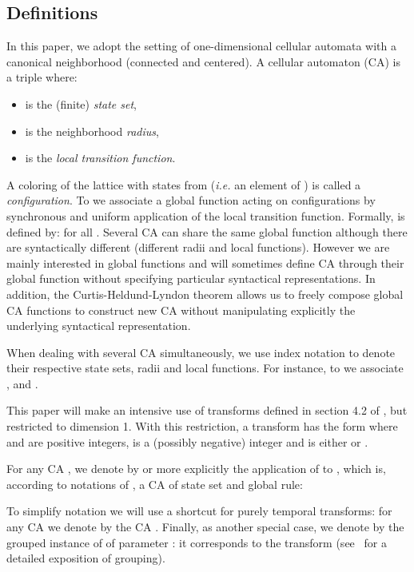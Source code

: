 \documentclass[a4paper]{elsarticle}
\begin{document}
\subsection{Definitions}
\label{sec:def}

In this paper, we adopt the setting of one-dimensional cellular
automata with a canonical neighborhood (connected and centered).  A
cellular automaton (CA) is a triple  where:
\begin{itemize}
\item  is the (finite) \emph{state set},
\item  is the neighborhood \emph{radius},
\item  is the \emph{local transition function}.
\end{itemize}

A coloring of the lattice  with states from 
(\textit{i.e.}  an element of ) is called a
\emph{configuration}.  To  we associate a global function
 acting on configurations by synchronous and uniform
application of the local transition function.  Formally,  is defined by:
 for all .  Several
CA can share the same global function although there are syntactically
different (different radii and local functions). However we are mainly
interested in global functions and will sometimes define CA through
their global function without specifying particular syntactical
representations. In addition, the Curtis-Heldund-Lyndon theorem
\cite{Hedlund:1969} allows us to freely compose global CA functions to
construct new CA without manipulating explicitly the underlying
syntactical representation.

When dealing with several CA simultaneously, we use index notation to
denote their respective state sets, radii and local functions. For
instance, to  we associate ,  and .

This paper will make an intensive use of  transforms defined
in section 4.2 of \cite{bulking1}, but restricted to dimension 1. With
this restriction, a  transform  has the form
 where  and  are
positive integers,  is a (possibly negative) integer and  is
either  or .

For any CA , we denote by  or more
explicitly  the application of  to
, which is, according to notations of \cite{bulking1}, a CA of
state set  and global rule:

To simplify notation we will use a shortcut for purely temporal
transforms: for any CA  we denote by  the CA
. Finally, as another special case, we denote
by  the grouped instance of  of parameter : it
corresponds to the transform 
(see~\cite{bulking1} for a detailed exposition of grouping).
\end{document}
